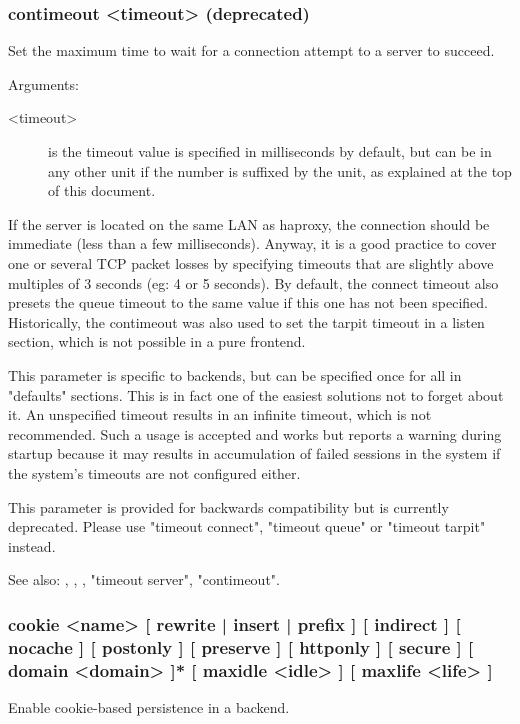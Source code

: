 \subsubsection[contimeout]{contimeout <timeout> (deprecated)}
  Set the maximum time to wait for a connection attempt to a server to succeed.

  Arguments:
  \begin{description}
  \item[<timeout>] is the timeout value is specified in milliseconds by default, but
              can be in any other unit if the number is suffixed by the unit,
              as explained at the top of this document.  
  \end{description}

  If the server is located on the same LAN as haproxy, the connection should be
  immediate (less than a few milliseconds). Anyway, it is a good practice to
  cover one or several TCP packet losses by specifying timeouts that are
  slightly above multiples of 3 seconds (eg: 4 or 5 seconds). By default, the
  connect timeout also presets the queue timeout to the same value if this one
  has not been specified. Historically, the contimeout was also used to set the
  tarpit timeout in a listen section, which is not possible in a pure frontend.

  This parameter is specific to backends, but can be specified once for all in
  "defaults" sections. This is in fact one of the easiest solutions not to
  forget about it. An unspecified timeout results in an infinite timeout, which
  is not recommended. Such a usage is accepted and works but reports a warning
  during startup because it may results in accumulation of failed sessions in
  the system if the system's timeouts are not configured either.

  This parameter is provided for backwards compatibility but is currently
  deprecated. Please use "timeout connect", "timeout queue" or "timeout tarpit"
  instead.

  See also: , , ,
             "timeout server", "contimeout".


\subsubsection[cookie]{cookie <name> [ rewrite | insert | prefix ] [ indirect ]  [ nocache ] [ postonly ] [ preserve ] [ httponly ] [ secure ] [ domain <domain> ]* [ maxidle <idle> ] [ maxlife <life> ]}
  Enable cookie-based persistence in a backend.
  

